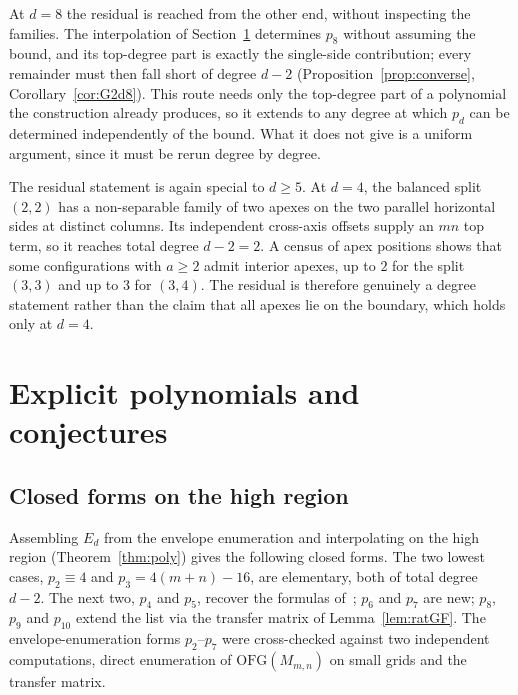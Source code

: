 \documentclass[11pt]{article}
\theoremstyle{definition}
\theoremstyle{remark}
\newcommand{\OFG}{\mathrm{OFG}}
\newcommand{\Mm}{M_{m,n}}
\begin{document}
At $d=8$ the residual is reached from the other end, without inspecting the
families. The interpolation of Section~\ref{sec:data} determines $p_8$
without assuming the bound, and its top-degree part is exactly the single-side
contribution; every remainder must then fall short of degree $d-2$
(Proposition~\ref{prop:converse}, Corollary~\ref{cor:G2d8}). This route needs
only the top-degree part of a polynomial the construction already produces, so it
extends to any degree at which $p_d$ can be determined independently of the
bound. What it does not give is a uniform argument, since it must be rerun degree
by degree.

The residual statement is again special to $d\ge5$. At $d=4$, the
balanced split $(2,2)$ has a non-separable family of two apexes on
the two parallel horizontal sides at distinct columns. Its independent cross-axis
offsets supply an $mn$ top term, so it reaches total degree $d-2=2$. A census of apex
positions shows that some configurations with $a\ge2$ admit interior apexes, up
to $2$ for the split $(3,3)$ and up to $3$ for $(3,4)$. The residual is therefore
genuinely a degree statement rather than the claim that all apexes lie on the
boundary, which holds only at $d=4$.

\section{Explicit polynomials and conjectures}\label{sec:data}

\subsection{Closed forms on the high region}\label{subsec:high}

Assembling $E_d$ from the envelope enumeration and interpolating on the high
region (Theorem~\ref{thm:poly}) gives the following closed forms. The two lowest
cases, $p_2\equiv4$ and
$p_3=4(m+n)-16$, are elementary, both of total degree $d-2$. The next two,
$p_4$ and $p_5$, recover the formulas of~\cite{Gupta2026companion}; $p_6$ and
$p_7$ are new; $p_8$, $p_9$ and $p_{10}$ extend the list via the transfer matrix
of Lemma~\ref{lem:ratGF}. The envelope-enumeration forms $p_2$--$p_7$ were
cross-checked against two independent computations, direct enumeration of
$\OFG(\Mm)$ on small grids and the transfer matrix.
\end{document}

